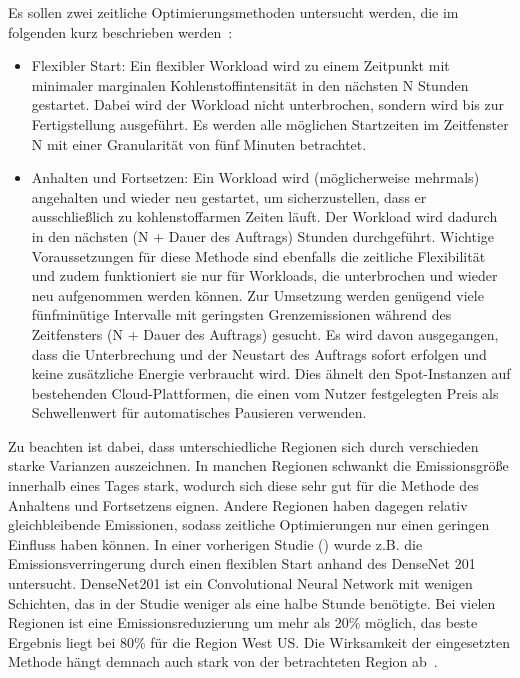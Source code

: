 \noindent Es sollen zwei zeitliche Optimierungsmethoden untersucht werden, die im folgenden kurz beschrieben werden~\cite{Dodge.06212022}:
\begin{itemize}
 \item Flexibler Start: Ein flexibler Workload wird zu einem Zeitpunkt mit minimaler marginalen Kohlenstoffintensität in den nächsten N Stunden gestartet.
 Dabei wird der Workload nicht unterbrochen, sondern wird bis zur Fertigstellung ausgeführt.
 Es werden alle möglichen Startzeiten im Zeitfenster N mit einer Granularität von fünf Minuten betrachtet.
 \item Anhalten und Fortsetzen: Ein Workload wird (möglicherweise mehrmals) angehalten und wieder neu gestartet, um sicherzustellen, dass er ausschließlich zu kohlenstoffarmen Zeiten läuft.
 Der Workload wird dadurch in den nächsten (N + Dauer des Auftrags) Stunden durchgeführt.
 Wichtige Voraussetzungen für diese Methode sind ebenfalls die zeitliche Flexibilität und zudem funktioniert sie nur für Workloads, die unterbrochen und wieder neu aufgenommen werden können.
 Zur Umsetzung werden genügend viele fünfminütige Intervalle mit geringsten Grenzemissionen während des Zeitfensters (N + Dauer des Auftrags) gesucht.
 Es wird davon ausgegangen, dass die Unterbrechung und der Neustart des Auftrags sofort erfolgen und keine zusätzliche Energie verbraucht wird.
 Dies ähnelt den Spot-Instanzen auf bestehenden Cloud-Plattformen, die einen vom Nutzer festgelegten Preis als Schwellenwert für automatisches Pausieren verwenden.
\end {itemize}
Zu beachten ist dabei, dass unterschiedliche Regionen sich durch verschieden starke Varianzen auszeichnen.
In manchen Regionen schwankt die Emissionsgröße innerhalb eines Tages stark, wodurch sich diese sehr gut für die Methode des Anhaltens und Fortsetzens eignen.
Andere Regionen haben dagegen relativ gleichbleibende Emissionen, sodass zeitliche Optimierungen nur einen geringen Einfluss haben können.
In einer vorherigen Studie (\cite{Dodge.06212022}) wurde z.B. die Emissionsverringerung durch einen flexiblen Start anhand des DenseNet 201 untersucht.
DenseNet201 ist ein Convolutional Neural Network mit wenigen Schichten, das in der Studie weniger als eine halbe Stunde benötigte.
Bei vielen Regionen ist eine Emissionsreduzierung um mehr als 20\% möglich, das beste Ergebnis liegt bei 80\% für die Region West US\@.
Die Wirksamkeit der eingesetzten Methode hängt demnach auch stark von der betrachteten Region ab~\cite{Dodge.06212022}.


